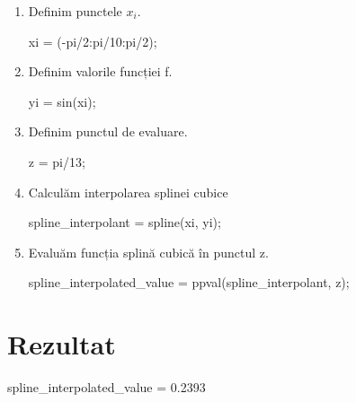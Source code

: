 \documentclass{article}
\begin{document}
\begin{center}
\begin{enumerate}
\item  Definim punctele $x_i$. \\
\begin{center}
    xi = (-pi/2:pi/10:pi/2);
\end{center}
\item Definim valorile funcției f. \\
 \begin{center}
    yi = sin(xi);
 \end{center}
\item Definim punctul de evaluare. \\
 \begin{center}
    z = pi/13;
 \end{center}
 \item Calculăm interpolarea splinei cubice \\
 \begin{center}
    spline\_interpolant = spline(xi, yi);
 \end{center}
  \item Evaluăm funcția splină cubică în punctul z. \\
 \begin{center}
    spline\_interpolated\_value = ppval(spline\_interpolant, z);
 \end{center}
\end{enumerate}
\end{center}

\section*{Rezultat}
\begin{center}
spline\_interpolated\_value = 0.2393
\end{center}
\end{document}
